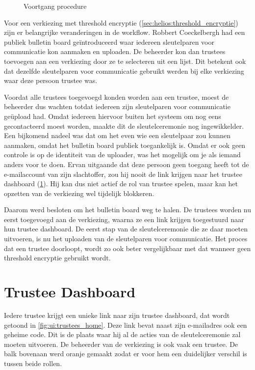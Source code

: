 \begin{figure}
  \caption{Voortgang procedure}
  \label{fig:ui:election_progress}
\end{figure}

\npar Voor een verkiezing met threshold encryptie (\ref{sec:helios:threshold_encryptie}) zijn er belangrijke veranderingen in de workflow. Robbert Coeckelbergh had een publiek bulletin board ge\"introduceerd waar iedereen sleutelparen voor communicatie kon aanmaken en uploaden. De beheerder kon dan trustees toevoegen aan een verkiezing door ze te selecteren uit een lijst. Dit betekent ook dat dezelfde sleutelparen voor communicatie gebruikt werden bij elke verkiezing waar deze persoon trustee was.

\npar Voordat alle trustees toegevoegd konden worden aan een trustee, moest de beheerder dus wachten totdat iedereen zijn sleutelparen voor communicatie ge\"upload had. Omdat iedereen hiervoor buiten het systeem om nog eens gecontacteerd moest worden, maakte dit de sleutelceremonie nog ingewikkelder. Een bijkomend nadeel was dat om het even wie een sleutelpaar zou kunnen aanmaken, omdat het bulletin board publiek toegankelijk is. Omdat er ook geen controle is op de identiteit van de uploader, was het mogelijk om je als iemand anders voor te doen. Ervan uitgaande dat deze persoon geen toegang heeft tot de e-mailaccount van zijn slachtoffer, zou hij nooit de link krijgen naar het trustee dashboard (\ref{sec:ui:trustee_dashboard}). Hij kan dus niet actief de rol van trustee spelen, maar kan het opzetten van de verkiezing wel tijdelijk blokkeren.

\npar Daarom werd besloten om het bulletin board weg te halen. De trustees worden nu eerst toegevoegd aan de verkiezing, waarna ze een link krijgen toegestuurd naar hun trustee dashboard. De eerst stap van de sleutelceremonie die ze daar moeten uitvoeren, is nu het uploaden van de sleutelparen voor communicatie. Het proces dat een trustee doorloopt, wordt zo ook beter vergelijkbaar met dat wanneer geen threshold encryptie gebruikt wordt.

\section{Trustee Dashboard}
\label{sec:ui:trustee_dashboard}

Iedere trustee krijgt een unieke link naar zijn trustee dashboard, dat wordt getoond in \ref{fig:ui:trustees_home}. Deze link bevat naast zijn e-mailadres ook een geheime code. Dit is de plaats waar hij al de acties van de sleutelceremonie zal moeten uitvoeren. De beheerder van de verkiezing is ook vaak een trustee. De balk bovenaan werd oranje gemaakt zodat er voor hem een duidelijker verschil is tussen beide rollen.


